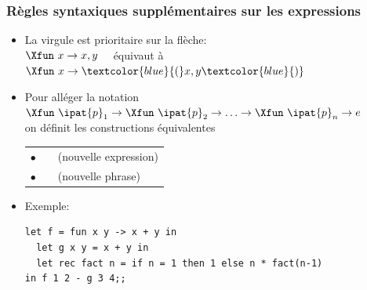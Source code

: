 %
\begin{frame}[containsverbatim]
\frametitle{Règles syntaxiques supplémentaires sur les expressions}

\begin{itemize}

  \item La virgule est prioritaire sur la flèche:\\
        $\Xfun \,\, x \rightarrow x, y$ \ \ équivaut à \ \
        $\Xfun \,\, x \rightarrow \textcolor{blue}{(}x,y\textcolor{blue}{)}$

  \item Pour alléger la notation $\Xfun \,\, \ipat{p}_1 \rightarrow
  \Xfun \,\, \ipat{p}_2 \rightarrow \ldots \rightarrow \Xfun \,\,
  \ipat{p}_n \rightarrow e$\\
  on définit les constructions équivalentes

        \begin{tabular}{rll}
            $\bullet$
          & \phrase{$\Xlet \,\,
            \textrm{[}\Xrec\textrm{]} \,\, f
            = \Xfun \,\, \ipat{p}_1 \, \ipat{p}_2 \, \textcolor{blue}{\ldots
            \, \ipat{p}_n} \rightarrow e$}
          & (nouvelle expression)\\
            $\bullet$
          & \phrase{$\Xlet \,\,
            \textrm{[}\Xrec\textrm{]} \,\, f
            \,\, \ipat{p}_1 \, \ipat{p}_2 \, \textcolor{blue}{\ldots \,
            \ipat{p}_n} = e$}
          & (nouvelle phrase)
        \end{tabular}

  \item Exemple:
  {\small
   \begin{verbatim}
let f = fun x y -> x + y in
  let g x y = x + y in
  let rec fact n = if n = 1 then 1 else n * fact(n-1)
in f 1 2 - g 3 4;;
  \end{verbatim}
  }

\end{itemize}

\end{frame}

